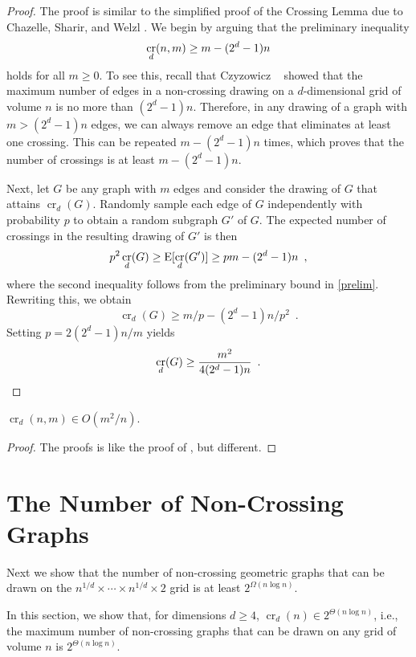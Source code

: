 \documentclass{patmorin}
\DeclareMathOperator{\crs}{cr}
\begin{document}
\begin{proof}
  The proof is similar to the simplified proof of the Crossing Lemma
  due to Chazelle, Sharir, and Welzl \cite{S}.  We begin by arguing that
  the preliminary inequality 
  \begin{equation}
    \crs_d(n,m) \ge m - (2^d-1)n  \eqlabel{prelim}
  \end{equation}
  holds for all $m \ge 0$.  To see this, recall that Czyzowicz \etal\
  \cite{s} showed that the maximum number of edges in a non-crossing
  drawing on a $d$-dimensional grid of volume $n$ is no more than
  $(2^d-1)n$.  Therefore, in any drawing of a graph with $m> (2^d-1)n$
  edges, we can always remove an edge that eliminates at least one
  crossing.  This can be repeated $m-(2^d-1)n$ times, which proves that
  the number of crossings is at least $m-(2^d-1)n$.

  Next, let $G$ be any graph with $m$ edges and consider the drawing
  of $G$ that attains $\crs_d(G)$.  Randomly sample each edge of $G$
  independently with probability $p$ to obtain a random subgraph $G'$
  of $G$.  The expected number of crossings in the resulting drawing of
  $G'$ is then
  \[  p^2\crs_d(G) \ge \E[\crs_d(G')] \ge pm - (2^d-1)n \enspace ,\] 
  where the second inequality follows from the preliminary bound
  in \eqref{prelim}.  Rewriting this, we obtain
  \[  \crs_d(G) \ge m/p - (2^d-1)n/p^2 \enspace . \]
  Setting $p=2(2^{d}-1)n/m$ yields
  \[  \crs_d(G) \ge \frac{m^2}{4(2^{d}-1)n} \enspace .  \qedhere \]
\end{proof}


\begin{thm}
  $\crs_d(n,m)\in O(m^2/n)$.
\end{thm}

\begin{proof}
The proofs is like the proof of , but different.
\end{proof}

\section{The Number of Non-Crossing Graphs}

Next we show that the number of non-crossing geometric graphs that can
be drawn on the $n^{1/d}\times \cdots\times n^{1/d}\times 2$ grid is
at least $2^{\Omega(n\log n)}$.  

In this section, we show that, for dimensions $d\ge 4$, $\crs_d(n)\in
2^{\Theta(n\log n)}$, i.e., the maximum number of non-crossing graphs
that can be drawn on any grid of volume $n$ is $2^{\Theta(n\log n)}$.
\end{document}
